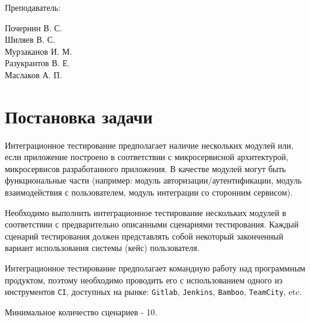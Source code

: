\documentclass[a4paper, 14pt]{article}
\begin{document}
\begin{titlepage}
\begin{multicols}{2}
\begin{flushright}
            {Преподаватель:\\}

        \end{flushright}
        \begin{flushright}

            {Почернин В. С.}\\
            {Шиляев В. С.}\\
            {Мурзаканов И. М.}\\
            {Разукрантов В. Е.}\\[0.5cm]


            Маслаков А. П.\\

        \end{flushright}
    \end{multicols}

    \flushright{
        {\phantom{qwe}}\\[0.5cm]
    }

    \vfill
\end{titlepage}

\Large
\tableofcontents
\newpage
\large

\section{Постановка задачи}

Интеграционное тестирование предполагает наличие нескольких модулей или, если приложение построено в соответствии с микросервисной архитектурой, микросервисов разработанного приложения. В качестве модулей могут быть функциональные части (например: модуль авторизации/аутентификации, модуль взаимодействия с пользователем, модуль интеграции со сторонним сервисом).

Необходимо выполнить интеграционное тестирование нескольких модулей в соответствии с предварительно описанными сценариями тестирования. Каждый сценарий тестирования должен представлять собой некоторый законченный вариант использования системы (кейс) пользователя.

Интеграционное тестирование предполагает командную работу над программным продуктом, поэтому необходимо проводить его с использованием одного из инструментов \texttt{CI}, доступных на рынке: \texttt{Gitlab}, \texttt{Jenkins}, \texttt{Bamboo}, \texttt{TeamCity}, etc.

Минимальное количество сценариев - 10.
\end{document}
